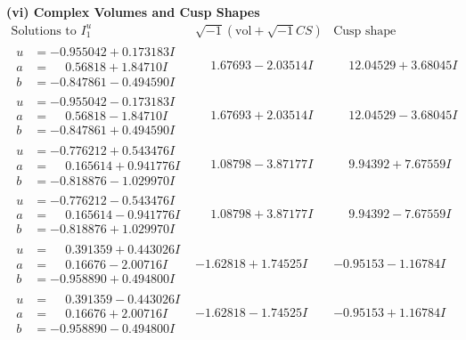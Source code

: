 \documentclass[1p]{elsarticle_modified}
\theoremstyle{definition}
\newcommand{\I}{\sqrt{-1}}
\begin{document}
\newpage\flushleft \textbf{(vi) Complex Volumes and Cusp Shapes}
$$\begin{array}{c|c|c}  
\text{Solutions to }I^u_{1}& \I (\text{vol} + \sqrt{-1}CS) & \text{Cusp shape}\\
 \hline 
\begin{aligned}
u &= -0.955042 + 0.173183 I \\
a &= \phantom{-}0.56818 + 1.84710 I \\
b &= -0.847861 - 0.494590 I\end{aligned}
 & \phantom{-}1.67693 - 2.03514 I & \phantom{-}12.04529 + 3.68045 I \\ \hline\begin{aligned}
u &= -0.955042 - 0.173183 I \\
a &= \phantom{-}0.56818 - 1.84710 I \\
b &= -0.847861 + 0.494590 I\end{aligned}
 & \phantom{-}1.67693 + 2.03514 I & \phantom{-}12.04529 - 3.68045 I \\ \hline\begin{aligned}
u &= -0.776212 + 0.543476 I \\
a &= \phantom{-}0.165614 + 0.941776 I \\
b &= -0.818876 - 1.029970 I\end{aligned}
 & \phantom{-}1.08798 - 3.87177 I & \phantom{-}9.94392 + 7.67559 I \\ \hline\begin{aligned}
u &= -0.776212 - 0.543476 I \\
a &= \phantom{-}0.165614 - 0.941776 I \\
b &= -0.818876 + 1.029970 I\end{aligned}
 & \phantom{-}1.08798 + 3.87177 I & \phantom{-}9.94392 - 7.67559 I \\ \hline\begin{aligned}
u &= \phantom{-}0.391359 + 0.443026 I \\
a &= \phantom{-}0.16676 - 2.00716 I \\
b &= -0.958890 + 0.494800 I\end{aligned}
 & -1.62818 + 1.74525 I & -0.95153 - 1.16784 I \\ \hline\begin{aligned}
u &= \phantom{-}0.391359 - 0.443026 I \\
a &= \phantom{-}0.16676 + 2.00716 I \\
b &= -0.958890 - 0.494800 I\end{aligned}
 & -1.62818 - 1.74525 I & -0.95153 + 1.16784 I \\ \hline\begin{aligned}

\end{aligned}
\end{array}$$
\end{document}

